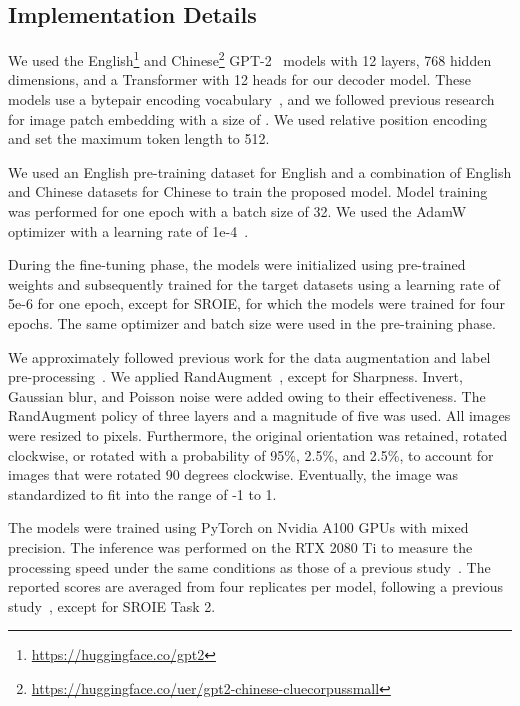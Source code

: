 \documentclass[10pt,twocolumn,letterpaper]{article}
\begin{document}
\subsection{Implementation Details}

We used the English\footnote{\url{https://huggingface.co/gpt2}} and Chinese\footnote{\url{https://huggingface.co/uer/gpt2-chinese-cluecorpussmall}} GPT-2~\cite{radford2019language} models with 12 layers, 768 hidden dimensions, and a Transformer with 12 heads for our decoder model.
These models use a bytepair encoding vocabulary~\cite{sennrich2016bpe}, and we followed previous research~\cite{bautista2022parseq} for image patch embedding with a size of . 
We used relative position encoding and set the maximum token length to 512.



We used an English pre-training dataset for English and a combination of English and Chinese datasets for Chinese to train the proposed model. 
Model training was performed for one epoch with a batch size of 32.
We used the AdamW optimizer with a learning rate of 1e-4~\cite{loshchilov2018adamw}.



During the fine-tuning phase, the models were initialized using pre-trained weights and subsequently trained for the target datasets using a learning rate of 5e-6 for one epoch, except for SROIE, for which the models were trained for four epochs.
The same optimizer and batch size were used in the pre-training phase.


We approximately followed previous work for the data augmentation and label pre-processing~\cite{bautista2022parseq}.
We applied RandAugment~\cite{cubuk2020randaugment}, except for Sharpness.
Invert, Gaussian blur, and Poisson noise were added owing to their effectiveness.
The RandAugment policy of three layers and a magnitude of five was used.
All images were resized to  pixels.
Furthermore, the original orientation was retained, rotated clockwise, or rotated with a probability of 95\%, 2.5\%, and 2.5\%, to account for images that were rotated 90 degrees clockwise. 
Eventually, the image was standardized to fit into the range of -1 to 1.

The models were trained using PyTorch on Nvidia A100 GPUs with mixed precision. 
The inference was performed on the RTX 2080 Ti to measure the processing speed under the same conditions as those of a previous study~\cite{yu2021btcr}. The reported scores are averaged from four replicates per model, following a previous study~\cite{bautista2022parseq}, except for SROIE Task 2.
\end{document}

